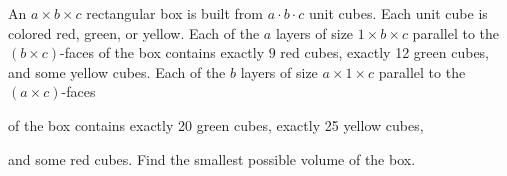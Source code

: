 An $a\times b\times c$ rectangular box is built from $a\cdot b \cdot c$ unit cubes. Each unit cube is colored red, green, or yellow. Each of the $a$ layers of size $1\times b \times c$ parallel to the $(b\times c)$-faces of the box contains exactly $9$ red cubes, exactly 12 green cubes, and some yellow cubes. Each of the $b$ layers of size $a\times 1 \times c$ parallel to the $(a\times c)$-faces

 of the box contains exactly 20 green cubes, exactly 25 yellow cubes, 

and some red cubes. Find the smallest possible volume of the box.